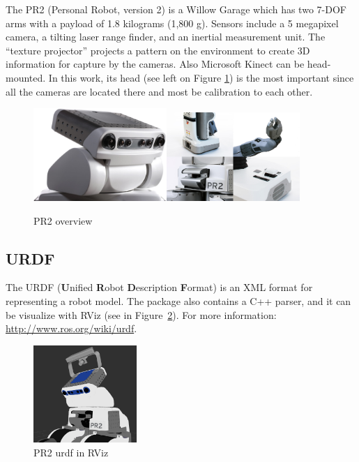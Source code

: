 The PR2 (Personal Robot, version 2) is a Willow Garage which has two 7-DOF arms with a payload of 1.8 kilograms (1,800 g). Sensors include a 5 megapixel camera, a tilting laser range finder, and an inertial measurement unit. The ``texture projector'' projects a pattern on the environment to create 3D information for capture by the cameras. Also Microsoft Kinect can be head-mounted. In this work, its head (see left on Figure \ref{fig:pr2}) is the most important since all the cameras are located there and most be calibration to each other.
\begin{figure}[!htbp]
 \centering
 \includegraphics[width=0.45\textwidth]{images/PR2_01.jpg}\includegraphics[width=0.45\textwidth]{images/PR2_joint.jpg}
 \caption{PR2 overview}
 \label{fig:pr2}
\end{figure}


\subsection{URDF}
\label{sec:urdf}

The URDF (\textbf{U}nified \textbf{R}obot \textbf{D}escription \textbf{F}ormat) is an XML format for representing a robot model. The package also contains a C++ parser, and it can be visualize with RViz (see in Figure~\ref{fig:pr2_urdf}).
For more information: \url{http://www.ros.org/wiki/urdf}.
\begin{figure}[!htbp]
 \centering
 \includegraphics[width=0.35\textwidth]{images/screenshots/PR2_urdf.png}
 \caption{PR2 urdf in RViz}
 \label{fig:pr2_urdf}
\end{figure}


